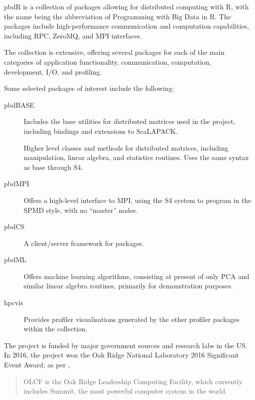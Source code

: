 pbdR is a collection of packages allowing for distributed computing with
R\cite{pbdBASEpackage}, with the name being the abbreviation of
Programming with Big Data in R. The packages include high-performance
communication and computation capabilities, including RPC, ZeroMQ, and
MPI interfaces.

The collection is extensive, offering several packages for each of the
main categories of application functionality, communication,
computation, development, I/O, and profiling.

Some selected packages of interest include the following:

\begin{description}

    \item[pbdBASE]
        Includes the base utilities for distributed matrices used in the
        project, including bindings and extensions to
        ScaLAPACK\cite{pbdBASEpackage}.
    \item[]
        Higher level classes and methods for distributed matrices, including
        manipulation, linear algebra, and statistics routines. Uses the same
        syntax as base \R through S4\cite{pbdDMATpackage}.
    \item[pbdMPI]
        Offers a high-level interface to MPI, using the S4 system to program in
        the SPMD style, with no ``master'' nodes\cite{Chen2012pbdMPIpackage}.
    \item[pbdCS]
        A client/server framework for 
        packages\cite{Schmidt2015pbdCSpackage}.
    \item[pbdML]
        Offers machine learning algorithms, consisting at present of only PCA
        and similar linear algebra routines, primarily for demonstration
        purposes\cite{schmidt20}.
    \item[hpcvis]
        Provides profiler visualisations generated by the other profiler
        packages within the collection\cite{hpcvis}.
\end{description}

The project is funded by major government sources and research labs in
the US. In 2016, the project won the Oak Ridge National Laboratory 2016
Significant Event Award; as per \cite{pbdR2012},

\begin{quote}
    OLCF is the Oak Ridge Leadership Computing Facility, which currently
    includes Summit, the most powerful computer system in the world.
\end{quote}

